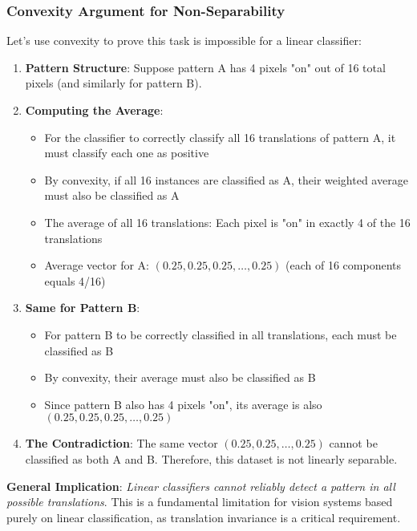 \subsubsection{Convexity Argument for Non-Separability}

Let's use convexity to prove this task is impossible for a linear classifier:

\begin{enumerate}
    \item \textbf{Pattern Structure}: Suppose pattern A has 4 pixels "on" out of 16 total pixels (and similarly for pattern B).

    \item \textbf{Computing the Average}:
    \begin{itemize}
        \item For the classifier to correctly classify all 16 translations of pattern A, it must classify each one as positive
        \item By convexity, if all 16 instances are classified as A, their weighted average must also be classified as A
        \item The average of all 16 translations: Each pixel is "on" in exactly 4 of the 16 translations
        \item Average vector for A: \((0.25, 0.25, 0.25, \ldots, 0.25)\) (each of 16 components equals 4/16)
    \end{itemize}

    \item \textbf{Same for Pattern B}:
    \begin{itemize}
        \item For pattern B to be correctly classified in all translations, each must be classified as B
        \item By convexity, their average must also be classified as B
        \item Since pattern B also has 4 pixels "on", its average is also \((0.25, 0.25, 0.25, \ldots, 0.25)\)
    \end{itemize}

    \item \textbf{The Contradiction}: The same vector \((0.25, 0.25, \ldots, 0.25)\) cannot be classified as both A and B. Therefore, this dataset is not linearly separable.
\end{enumerate}

\textbf{General Implication}: \textit{Linear classifiers cannot reliably detect a pattern in all possible translations}. This is a fundamental limitation for vision systems based purely on linear classification, as translation invariance is a critical requirement.


